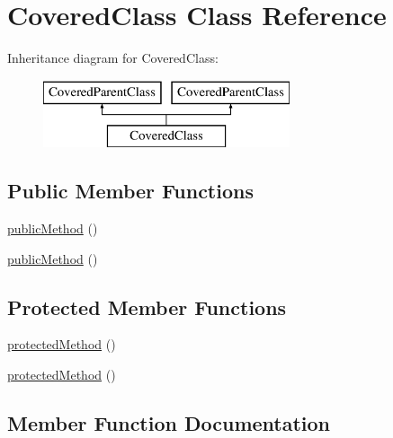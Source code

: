 \hypertarget{class_covered_class}{}\section{Covered\+Class Class Reference}
\label{class_covered_class}
Inheritance diagram for Covered\+Class\+:\begin{figure}[H]
\begin{center}
\leavevmode
\includegraphics[height=2.000000cm]{class_covered_class}
\end{center}
\end{figure}
\subsection*{Public Member Functions}
\begin{DoxyCompactItemize}
\item 
\mbox{\hyperlink{class_covered_class_ab07dfd901b43d1dcdbc2d116d7f5a566}{public\+Method}} ()
\item 
\mbox{\hyperlink{class_covered_class_ab07dfd901b43d1dcdbc2d116d7f5a566}{public\+Method}} ()
\end{DoxyCompactItemize}
\subsection*{Protected Member Functions}
\begin{DoxyCompactItemize}
\item 
\mbox{\hyperlink{class_covered_class_ab718380de0530a34b65401f7e81a211f}{protected\+Method}} ()
\item 
\mbox{\hyperlink{class_covered_class_ab718380de0530a34b65401f7e81a211f}{protected\+Method}} ()
\end{DoxyCompactItemize}


\subsection{Member Function Documentation}
\mbox{\label{class_covered_class_ab718380de0530a34b65401f7e81a211f}} 
